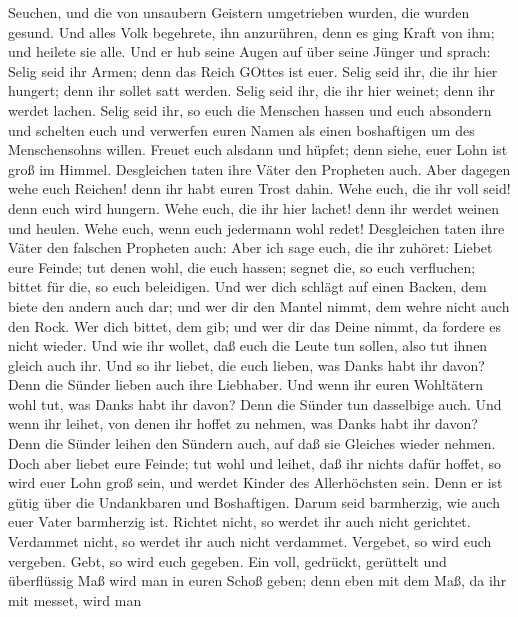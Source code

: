 Seuchen, und die von unsaubern Geistern umgetrieben wurden, die wurden
gesund.  Und alles Volk begehrete, ihn anzurühren, denn es
ging Kraft von ihm; und heilete sie alle.  Und er hub seine
Augen auf über seine Jünger und sprach: Selig seid ihr Armen; denn das
Reich GOttes ist euer.  Selig seid ihr, die ihr hier
hungert; denn ihr sollet satt werden. Selig seid ihr, die ihr hier
weinet; denn ihr werdet lachen.  Selig seid ihr, so euch
die Menschen hassen und euch absondern und schelten euch und verwerfen
euren Namen als einen boshaftigen um des Menschensohns willen.
 Freuet euch alsdann und hüpfet; denn siehe, euer Lohn ist
groß im Himmel. Desgleichen taten ihre Väter den Propheten auch.
 Aber dagegen wehe euch Reichen! denn ihr habt euren Trost
dahin.  Wehe euch, die ihr voll seid! denn euch wird
hungern. Wehe euch, die ihr hier lachet! denn ihr werdet weinen und
heulen.  Wehe euch, wenn euch jedermann wohl redet!
Desgleichen taten ihre Väter den falschen Propheten auch: 
Aber ich sage euch, die ihr zuhöret: Liebet eure Feinde; tut denen wohl,
die euch hassen;  segnet die, so euch verfluchen; bittet
für die, so euch beleidigen.  Und wer dich schlägt auf
einen Backen, dem biete den andern auch dar; und wer dir den Mantel
nimmt, dem wehre nicht auch den Rock.  Wer dich bittet, dem
gib; und wer dir das Deine nimmt, da fordere es nicht wieder.
 Und wie ihr wollet, daß euch die Leute tun sollen, also
tut ihnen gleich auch ihr.  Und so ihr liebet, die euch
lieben, was Danks habt ihr davon? Denn die Sünder lieben auch ihre
Liebhaber.  Und wenn ihr euren Wohltätern wohl tut, was
Danks habt ihr davon? Denn die Sünder tun dasselbige auch. 
Und wenn ihr leihet, von denen ihr hoffet zu nehmen, was Danks habt ihr
davon? Denn die Sünder leihen den Sündern auch, auf daß sie Gleiches
wieder nehmen.  Doch aber liebet eure Feinde; tut wohl und
leihet, daß ihr nichts dafür hoffet, so wird euer Lohn groß sein, und
werdet Kinder des Allerhöchsten sein. Denn er ist gütig über die
Undankbaren und Boshaftigen.  Darum seid barmherzig, wie
auch euer Vater barmherzig ist.  Richtet nicht, so werdet
ihr auch nicht gerichtet. Verdammet nicht, so werdet ihr auch nicht
verdammet. Vergebet, so wird euch vergeben.  Gebt, so wird
euch gegeben. Ein voll, gedrückt, gerüttelt und überflüssig Maß wird man
in euren Schoß geben; denn eben mit dem Maß, da ihr mit messet, wird man
